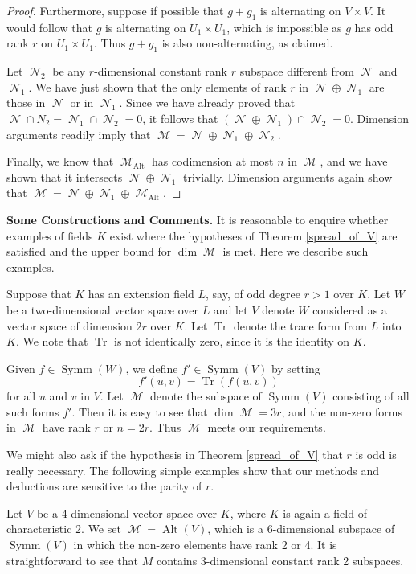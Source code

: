 \documentclass{amsart}
\DeclareMathOperator{\Tr}{Tr}
\DeclareMathOperator{\Alt}{Alt}
\DeclareMathOperator{\M}{\mathcal{M}}
\DeclareMathOperator{\N}{\mathcal{N}}
\DeclareMathOperator{\Symm}{Symm}
\theoremstyle{plain}
\theoremstyle{definition}
\begin{document}
\begin{proof}
Furthermore, suppose if possible that $g+g_1$ is alternating on $V\times V$. It would follow that $g$ is alternating on $U_1\times U_1$, which is 
impossible as $g$ has odd rank $r$ on $U_1\times U_1$. Thus $g+g_1$ is also non-alternating, as claimed. 

Let $\N_2$ be any $r$-dimensional constant rank $r$ subspace different from $\N$ and $\N_1$. We have just shown that the only
elements of rank $r$ in $\N\oplus \N_1$ are those in $\N$ or in $\N_1$. Since we have already proved that $\N\cap N_2=\N_1\cap \N_2=0$,
it follows that $(\N\oplus \N_1)\cap \N_2=0$. Dimension arguments readily imply that $\M=\N\oplus \N_1\oplus \N_2$.

Finally, we know that $\M_{\Alt}$ has codimension at most $n$ in $\M$, and we have shown that it intersects $\N\oplus \N_1$ trivially.
Dimension arguments again show that $ \M=\N\oplus \N_1\oplus \M_{\Alt}$.




\end{proof}

\noindent\textbf{Some Constructions and Comments.}
It is reasonable to enquire whether examples of fields $K$ exist where the hypotheses of Theorem \ref{spread_of_V} are satisfied and the upper
bound for $\dim \M$ is met. Here we describe such examples.

Suppose that $K$ has an extension field $L$, say, of odd degree $r>1$ over $K$. Let $W$ be a two-dimensional vector space over $L$ and let
$V$ denote $W$ considered as a vector space of dimension $2r$ over $K$. Let $\Tr$ denote the trace form from $L$ into $K$. We note that
$\Tr$ is not identically zero, since it is the identity on $K$.

Given $f\in \Symm(W)$, we define $f'\in \Symm(V)$ by setting
\[
 f'(u,v)=\Tr(f(u,v))
\]
for all $u$ and $v$ in $V$. Let $\M$ denote the subspace of $\Symm(V)$ consisting of all such forms $f'$. Then it is easy to see that
$\dim \M=3r$, and the non-zero forms in $\M$ have rank $r$ or $n=2r$. Thus $\M$ meets our requirements.

We might also ask if the hypothesis in Theorem \ref{spread_of_V} that $r$ is odd is really necessary. The following simple examples
show that our methods and deductions are sensitive to the parity of $r$.

Let $V$ be a 4-dimensional vector space over $K$, where $K$ is again a field of characteristic 2. We set $\M=\Alt(V)$, which is a 6-dimensional
subspace of $\Symm(V)$ in which the non-zero elements have rank 2 or 4. It is straightforward to see that $M$ contains 3-dimensional
constant rank 2 subspaces.
\end{document}
